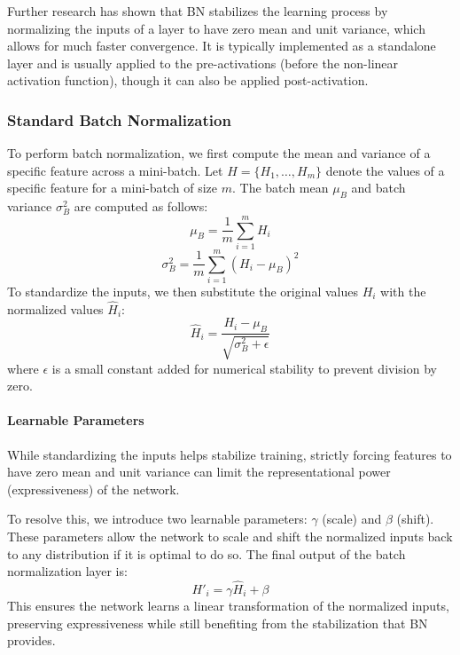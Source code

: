 Further research has shown that BN stabilizes the learning process by normalizing the inputs of a layer to have zero mean and unit variance, which allows for much faster convergence.
It is typically implemented as a standalone layer and is usually applied to the pre-activations (before the non-linear activation function), though it can also be applied post-activation.

\subsubsection{Standard Batch Normalization}
To perform batch normalization, we first compute the mean and variance of a specific feature across a mini-batch.
Let $H=\{H_1,\ldots,H_m\}$ denote the values of a specific feature for a mini-batch of size $m$. The batch mean $\mu_B$ and batch variance $\sigma_B^2$ are computed as follows:
\begin{equation*}
    \mu_B = \frac{1}{m} \sum_{i=1}^{m} H_i
\end{equation*}
\begin{equation*}
    \sigma_B^2 = \frac{1}{m} \sum_{i=1}^{m} (H_i - \mu_B)^2
\end{equation*}
To standardize the inputs, we then substitute the original values $H_i$ with the normalized values $\hat{H}_i$:
\begin{equation*}
    \hat{H}_i = \frac{H_i - \mu_B}{\sqrt{\sigma_B^2 + \epsilon}}
\end{equation*}
where $\epsilon$ is a small constant added for numerical stability to prevent division by zero.

\paragraph{Learnable Parameters}
While standardizing the inputs helps stabilize training, strictly forcing features to have zero mean and unit variance can limit the representational power (expressiveness) of the network.

To resolve this, we introduce two learnable parameters: $\gamma$ (scale) and $\beta$ (shift).
These parameters allow the network to scale and shift the normalized inputs back to any distribution if it is optimal to do so. The final output of the batch normalization layer is:
\begin{equation*}
    H'_i = \gamma \hat{H}_i + \beta
\end{equation*}
This ensures the network learns a linear transformation of the normalized inputs, preserving expressiveness while still benefiting from the stabilization that BN provides.


